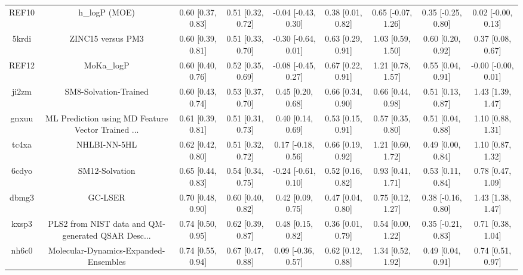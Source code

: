 \documentclass{article}
\begin{document}
\begin{center}
\begin{longtable}{|ccccccccc|}
 REF10 &                                      h\_logP (MOE) &  0.60 [0.37, 0.83] &  0.51 [0.32, 0.72] &   -0.04 [-0.43, 0.30] &  0.38 [0.01, 0.82] &   0.65 [-0.07, 1.26] &   0.35 [-0.25, 0.80] &    0.02 [-0.00, 0.13] \\
 5krdi &                                  ZINC15 versus PM3 &  0.60 [0.39, 0.81] &  0.51 [0.33, 0.70] &   -0.30 [-0.64, 0.01] &  0.63 [0.29, 0.91] &    1.03 [0.59, 1.50] &    0.60 [0.20, 0.92] &     0.37 [0.08, 0.67] \\
 REF12 &                                         MoKa\_logP &  0.60 [0.40, 0.76] &  0.52 [0.35, 0.69] &   -0.08 [-0.45, 0.27] &  0.67 [0.22, 0.91] &    1.21 [0.78, 1.57] &    0.55 [0.04, 0.91] &   -0.00 [-0.00, 0.01] \\
 ji2zm &                              SM8-Solvation-Trained &  0.60 [0.43, 0.74] &  0.53 [0.37, 0.70] &     0.45 [0.20, 0.68] &  0.66 [0.34, 0.90] &    0.66 [0.44, 0.98] &    0.51 [0.13, 0.87] &     1.43 [1.39, 1.47] \\
 gnxuu &  ML Prediction using MD Feature Vector Trained ... &  0.61 [0.39, 0.81] &  0.51 [0.31, 0.73] &     0.40 [0.14, 0.69] &  0.53 [0.15, 0.91] &    0.57 [0.35, 0.80] &    0.51 [0.04, 0.88] &     1.10 [0.88, 1.31] \\
 tc4xa &                                       NHLBI-NN-5HL &  0.62 [0.42, 0.80] &  0.51 [0.32, 0.72] &    0.17 [-0.18, 0.56] &  0.66 [0.19, 0.92] &    1.21 [0.60, 1.72] &    0.49 [0.00, 0.84] &     1.10 [0.87, 1.32] \\
 6cdyo &                                     SM12-Solvation &  0.65 [0.44, 0.83] &  0.54 [0.34, 0.75] &   -0.24 [-0.61, 0.10] &  0.52 [0.16, 0.82] &    0.93 [0.41, 1.71] &    0.53 [0.11, 0.84] &     0.78 [0.47, 1.09] \\
 dbmg3 &                                            GC-LSER &  0.70 [0.48, 0.90] &  0.60 [0.40, 0.82] &     0.42 [0.09, 0.75] &  0.47 [0.04, 0.80] &    0.75 [0.12, 1.27] &   0.38 [-0.16, 0.80] &     1.43 [1.38, 1.47] \\
 kxsp3 &  PLS2 from NIST data and QM-generated QSAR Desc... &  0.74 [0.50, 0.95] &  0.62 [0.39, 0.87] &     0.48 [0.15, 0.82] &  0.36 [0.01, 0.79] &    0.54 [0.00, 1.22] &   0.35 [-0.21, 0.83] &     0.71 [0.38, 1.04] \\
 nh6c0 &              Molecular-Dynamics-Expanded-Ensembles &  0.74 [0.55, 0.94] &  0.67 [0.47, 0.88] &    0.09 [-0.36, 0.57] &  0.62 [0.12, 0.88] &    1.34 [0.52, 1.92] &    0.49 [0.04, 0.91] &     0.74 [0.51, 0.97] \\

\end{longtable}
\end{center}
\end{document}
